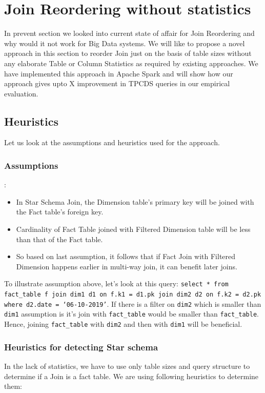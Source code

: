 \section{Join Reordering without statistics}\label{sec:jo}
In prevent section we looked into current state of affair for Join Reordering and why would it not work for Big Data systems. We will like to propose a novel approach in this section to reorder Join just on the basis of table sizes without any elaborate Table or Column Statistics as required by existing approaches.
We have implemented this approach in Apache Spark and will show how our approach gives upto X improvement in TPCDS queries in our empirical evaluation.

\subsection{Heuristics}

Let us look at the assumptions and heuristics used for the approach.

\subsubsection{Assumptions}\label{subsubsec:assumption}:

\begin{itemize}
\item In Star Schema Join, the Dimension table’s primary key will be joined with the Fact table’s foreign key.
\item Cardinality of Fact Table joined with Filtered Dimension table will be less than that of the Fact table.
\item So based on last assumption, it follows that if Fact Join with Filtered Dimension happens earlier in multi-way join, it can benefit later joins.
\end{itemize}

To illustrate assumption above, let's look at this query:
\texttt{select * from fact\_table f join dim1 d1 on f.k1 = d1.pk join dim2 d2 on f.k2 = d2.pk where d2.date = ‘06-10-2019’}. If there is a filter on \texttt{dim2} which is smaller than \texttt{dim1} assumption is it’s join with \texttt{fact\_table} would be smaller than \texttt{fact\_table}. Hence, joining \texttt{fact\_table} with \texttt{dim2} and then with \texttt{dim1} will be beneficial.

\subsubsection{Heuristics for detecting Star schema}
In the lack of statistics, we have to use only table sizes and query structure to determine if a Join is a fact table. We are using following heuristics to determine them:

